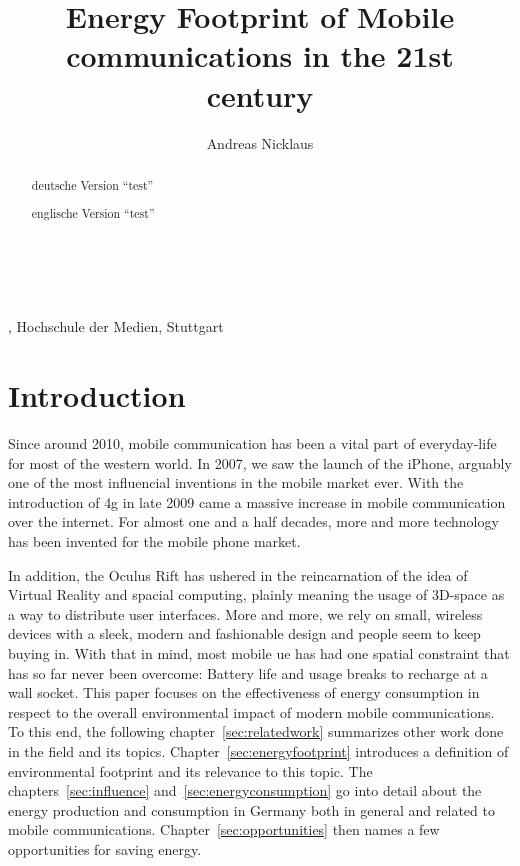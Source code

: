 \documentclass[11pt,a4paper]{article}
\title{Energy Footprint of Mobile communications in the 21st century}
\author{Andreas Nicklaus}
\makeatletter
\renewcommand\maketitle{
{\raggedright
\begin{center}
{\Large \bfseries \@title}\\[2ex] 
\@author\\[1ex] 
\@date, Hochschule der Medien, Stuttgart\\[1ex]
\end{center}}}
\makeatother
\begin{document}
\maketitle

\begin{abstract}
  deutsche Version \enquote{test}
\end{abstract}


\begin{abstract}
  englische Version \enquote{test}
\end{abstract}

\tableofcontents

\section{Introduction}\label{sec:intro}
Since around 2010, mobile communication has been a vital part of everyday-life for most of the western world.
In 2007, we saw the launch of the iPhone, arguably one of the most influencial inventions in the mobile market ever.
With the introduction of \acrfull{4g} in late 2009 came a massive increase in mobile communication over the internet.
For almost one and a half decades, more and more technology has been invented for the mobile phone market.

In addition, the Oculus Rift has ushered in the reincarnation of the idea of Virtual Reality and spacial computing, plainly meaning the usage of 3D-space as a way to distribute user interfaces.
More and more, we rely on small, wireless devices with a sleek, modern and fashionable design and people seem to keep buying in. 
With that in mind, most mobile \acrfull{ue} has had one spatial constraint that has so far never been overcome: Battery life and usage breaks to recharge at a wall socket.
This paper focuses on the effectiveness of energy consumption in respect to the overall environmental impact of modern mobile communications.
To this end, the following chapter~\ref{sec:relatedwork} summarizes other work done in the field and its topics.
Chapter~\ref{sec:energyfootprint} introduces a definition of environmental footprint and its relevance to this topic.
The chapters~\ref{sec:influence} and~\ref{sec:energyconsumption} go into detail about the energy production and consumption in Germany both in general and related to mobile communications.
Chapter~\ref{sec:opportunities} then names a few opportunities for saving energy.
\end{document}
